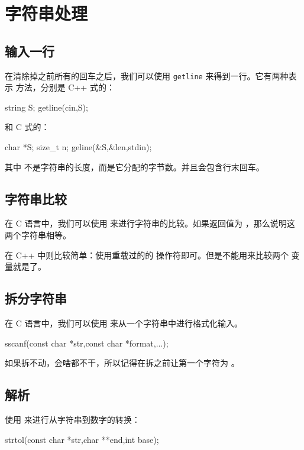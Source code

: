 \section{字符串处理}



\subsection{输入一行}
在清除掉之前所有的回车之后，我们可以使用 \verb|getline| 来得到一行。它有两种表示
方法，分别是 C++ 式的：
\begin{Cpp}
string S;
getline(cin,S);
\end{Cpp}

和 C 式的：
\begin{Cpp}
char *S; size_t n;
geline(&S,&len,stdin);
\end{Cpp}

其中  不是字符串的长度，而是它分配的字节数。并且会包含行末回车。



\subsection{字符串比较}
在 C 语言中，我们可以使用  来进行字符串的比较。如果返回值为 
，那么说明这两个字符串相等。

在 C++ 中则比较简单：使用重载过的的 \cmd{==} 操作符即可。但是不能用来比较两个
 变量就是了。



\subsection{拆分字符串}
在 C 语言中，我们可以使用  来从一个字符串中进行格式化输入。
\begin{Cpp}
sscanf(const char *str,const char *format,...);
\end{Cpp}

如果拆不动，会啥都不干，所以记得在拆之前让第一个字符为 。



\subsection{解析}
使用  来进行从字符串到数字的转换：
\begin{Cpp}
strtol(const char *str,char **end,int base);
\end{Cpp}


